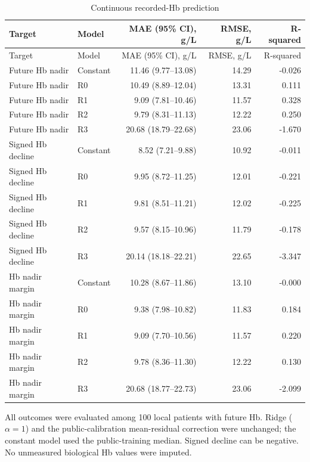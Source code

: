 \documentclass[pdflatex,sn-vancouver-num]{sn-jnl}
\begin{document}
\begin{longtable}{llrrr}
\caption{Continuous recorded-Hb prediction}\label{tab:s10}\\
\toprule
Target & Model & MAE (95\% CI), g/L & RMSE, g/L & R-squared\\\midrule
\endfirsthead
\toprule
Target & Model & MAE (95\% CI), g/L & RMSE, g/L & R-squared\\\midrule
\endhead
\endfoot
\bottomrule\endlastfoot
Future Hb nadir & Constant & 11.46 (9.77--13.08) & 14.29 & -0.026\\
Future Hb nadir & R0 & 10.49 (8.89--12.04) & 13.31 & 0.111\\
Future Hb nadir & R1 & 9.09 (7.81--10.46) & 11.57 & 0.328\\
Future Hb nadir & R2 & 9.79 (8.31--11.13) & 12.22 & 0.250\\
Future Hb nadir & R3 & 20.68 (18.79--22.68) & 23.06 & -1.670\\
Signed Hb decline & Constant & 8.52 (7.21--9.88) & 10.92 & -0.011\\
Signed Hb decline & R0 & 9.95 (8.72--11.25) & 12.01 & -0.221\\
Signed Hb decline & R1 & 9.81 (8.51--11.21) & 12.02 & -0.225\\
Signed Hb decline & R2 & 9.57 (8.15--10.96) & 11.79 & -0.178\\
Signed Hb decline & R3 & 20.14 (18.18--22.21) & 22.65 & -3.347\\
Hb nadir margin & Constant & 10.28 (8.67--11.86) & 13.10 & -0.000\\
Hb nadir margin & R0 & 9.38 (7.98--10.82) & 11.83 & 0.184\\
Hb nadir margin & R1 & 9.09 (7.70--10.56) & 11.57 & 0.220\\
Hb nadir margin & R2 & 9.78 (8.36--11.30) & 12.22 & 0.130\\
Hb nadir margin & R3 & 20.68 (18.77--22.73) & 23.06 & -2.099\\
\end{longtable}
\noindent All outcomes were evaluated among 100 local patients with future Hb. Ridge ($\alpha=1$) and the public-calibration mean-residual correction were unchanged; the constant model used the public-training median. Signed decline can be negative. No unmeasured biological Hb values were imputed.\par\endgroup
\begingroup\scriptsize\setlength{\tabcolsep}{2pt}
\end{document}
